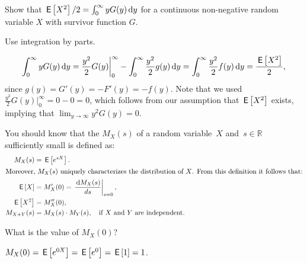 \documentclass[companion.tex]{subfiles}
\begin{document}
\begin{exercise}
 Show that $\,\mathsf{E}\left[X^2\right]/2 = \int_0^\infty y G(y) \,\text{d}y$ for a continuous non-negative random variable $X$ with survivor function $G$.
 \begin{solution}
 \begin{hint}
 Use integration by parts. 
 \end{hint}
 \begin{equation}
 \int_0^\infty y G(y) \,\text{d}y 
= \frac{y^2}2 G(y) \bigg|_0^\infty - \int_0^\infty \frac{y^2}2 g(y)\,\text{d}y = \int_0^\infty \frac{y^2}2 f(y)\,\text{d}y = \frac{\,\mathsf{E}\left[X^2\right]}2,
 \end{equation}
 since $g(y) = G'(y) = - F'(y) = - f(y)$. Note that we used $\frac{y^2}2 G(y) \bigg|_0^\infty = 0 - 0 = 0$, which follows from our assumption that $\,\mathsf{E}\left[X^2\right]$ exists, implying that $\lim_{y \to \infty} y^2G(y) = 0$.
\end{solution}
\end{exercise}


You should know that the  $M_X(s)$ of a random variable~$X$ and~$s\in \mathbb{R}$ sufficiently small is defined as: 
\begin{subequations}
\begin{align}
 M_X(s) &= \,\mathsf{E}\left[e^{s X}\right]. \label{eq:75}\\
\intertext{Moreover,  $M_X(s)$  uniquely characterizes the distribution of $X$. From this definition it follows that:}
 \,\mathsf{E}\left[X\right] &= M_{X}'(0) = \left.\frac{\,\text{d}M_{X}(s)}{d s}\right|_{s=0},\label{eq:69}\\
\,\mathsf{E}\left[X^2\right] &= M_{X}''(0), \label{eq:64}\\
M_{X+Y}(s) &= M_X(s)\cdot M_Y(s), \quad \text{if $X$ and $Y$ are independent}. \label{eq:73}
\end{align}
\end{subequations}

\begin{extra}
 What is the value of $M_X(0)$?
\begin{solution}
 $M_X(0) = \,\mathsf{E}\left[e^{0 X}\right] = \,\mathsf{E}\left[e^0\right] = \,\mathsf{E}\left[1\right] = 1$.
\end{solution}
\end{extra}
\end{document}

